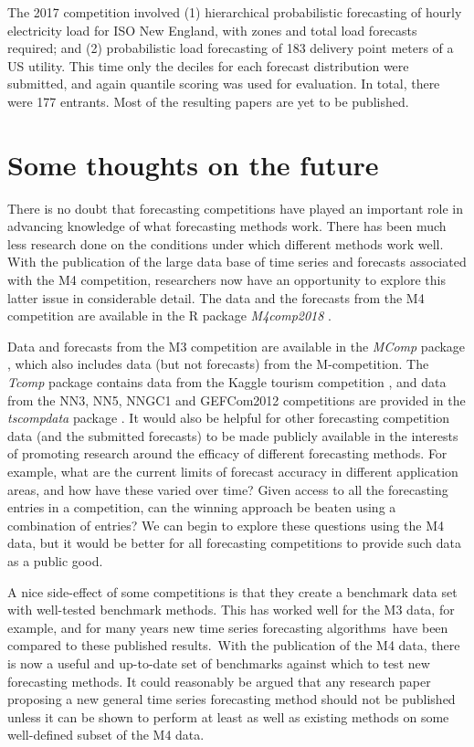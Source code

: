 \documentclass[11pt,a4paper,]{article}
\begin{document}
The 2017 competition \autocite{GEFCom2017} involved (1) hierarchical probabilistic forecasting of hourly electricity load for ISO New England, with zones and total load forecasts required; and (2) probabilistic load forecasting of 183 delivery point meters of a US utility. This time only the deciles for each forecast distribution were submitted, and again quantile scoring was used for evaluation. In total, there were 177 entrants. Most of the resulting papers are yet to be published.

\hypertarget{sec:future}{%
\section{Some thoughts on the future}\label{sec:future}}

There is no doubt that forecasting competitions have played an important role in advancing knowledge of what forecasting methods work. There has been much less research done on the conditions under which different methods work well. With the publication of the large data base of time series and forecasts associated with the M4 competition, researchers now have an opportunity to explore this latter issue in considerable detail. The data and the forecasts from the M4 competition are available in the R package \emph{M4comp2018} \autocite{RM4comp2018}.

Data and forecasts from the M3 competition are available in the \emph{MComp} package \autocite{RMcomp}, which also includes data (but not forecasts) from the M-competition. The \emph{Tcomp} package contains data from the Kaggle tourism competition \autocite{RTcomp}, and data from the NN3, NN5, NNGC1 and GEFCom2012 competitions are provided in the \emph{tscompdata} package \autocite{Rtscompdata}. It would also be helpful for other forecasting competition data (and the submitted forecasts) to be made publicly available in the interests of promoting research around the efficacy of different forecasting methods. For example, what are the current limits of forecast accuracy in different application areas, and how have these varied over time? Given access to all the forecasting entries in a competition, can the winning approach be beaten using a combination of entries? We can begin to explore these questions using the M4 data, but it would be better for all forecasting competitions to provide such data as a public good.

A nice side-effect of some competitions is that they create a benchmark data set with well-tested benchmark methods. This has worked well for the M3 data, for example, and for many years new time series forecasting algorithms~have been compared to these published results.~With the publication of the M4 data, there is now a useful and up-to-date set of benchmarks against which to test new forecasting methods. It could reasonably be argued that any research paper proposing a new general time series forecasting method should not be published unless it can be shown to perform at least as well as existing methods on some well-defined subset of the M4 data.
\end{document}
